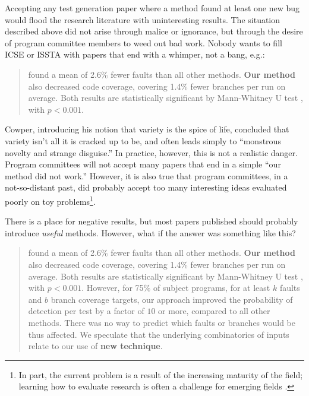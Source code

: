 \documentclass[sigplan]{acmart}
\begin{document}
Accepting any test generation paper where a method found at least one
new bug would flood the research literature with uninteresting
results.  The situation described above did not arise through malice
or ignorance, but through the desire of program committee members to
weed out bad work.  Nobody wants to fill ICSE or ISSTA with papers
that end with a whimper, not a bang, e.g.:

\begin{quote}
 found a mean of 2.6\% fewer faults than all
other methods.  {\bf Our
  method} also decreased code coverage, covering 1.4\% fewer branches
per run on average.  Both results are statistically significant by
Mann-Whitney U test \cite{arcuri2014hitchhiker}, with $p < 0.001$.
\end{quote}

Cowper, introducing his notion that variety is the spice of life,
concluded that variety isn't all it is cracked up to be, and often
leads simply to ``monstrous novelty and strange disguise.''  In
practice, however, this is not a realistic danger.  Program committees
will not accept many papers that end in a simple ``our method did not
work.''  However, it is also true that program committees, in a
not-so-distant past, did probably accept too many interesting ideas
evaluated poorly on toy problems\footnote{In part, the current problem is a
result of the increasing maturity of the field; learning how to evaluate research
is often a challenge for emerging fields \cite{10.1145/1294211.1294256}.}.

There is a place for negative results, but most papers published
should probably introduce \emph{useful} methods.  However, what if the
answer was something like this?

\begin{quote}
 found a mean of 2.6\% fewer faults than all
other methods.  {\bf Our
  method} also decreased code coverage, covering 1.4\% fewer branches
per run on average.  Both results are statistically significant by
Mann-Whitney U test \cite{arcuri2014hitchhiker}, with $p < 0.001$.
However, for 75\% of subject programs, for at least $k$ faults and $b$
branch coverage targets, our approach improved the probability of
detection per test by a factor of $10$ or more, compared to all other
methods.  There was no way to predict which faults or branches would
be thus affected.  We speculate that the underlying combinatorics of
inputs relate to our use of {\bf new technique}.
\end{quote}
\end{document}
